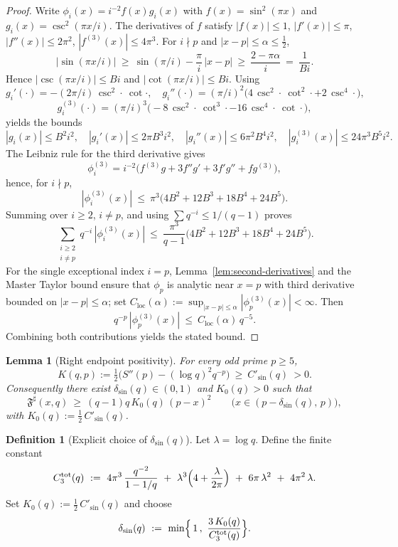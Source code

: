 \documentclass[11pt,a4paper]{amsart}
\newcommand{\Fbase}{\mathfrak F}
\newcommand{\Fsharp}{\Fbase^{\sharp}}
\theoremstyle{plain}
\newtheorem{lemma}[theorem]{Lemma}
\theoremstyle{definition}
\newtheorem{definition}[theorem]{Definition}
\theoremstyle{remark}
\begin{document}
\begin{proof}
Write $\phi_i(x)=i^{-2}f(x)g_i(x)$ with $f(x)=\sin^2(\pi x)$ and $g_i(x)=\csc^2(\pi x/i)$. The derivatives of $f$ satisfy $|f(x)|\le 1$, $|f'(x)|\le \pi$, $|f''(x)|\le 2\pi^2$, $|f^{(3)}(x)|\le 4\pi^3$. For $i\nmid p$ and $|x-p|\le\alpha\le\tfrac12$,
\[
|\sin(\pi x/i)|\ \ge\ \sin(\pi/i)-\frac{\pi}{i}\,|x-p|\ \ge\ \frac{2-\pi\alpha}{i}\ =\ \frac{1}{Bi}.
\]
Hence $|\csc(\pi x/i)|\le Bi$ and $|\cot(\pi x/i)|\le Bi$. Using
\[
g_i'(\cdot)=-(2\pi/i)\,\csc^2\!\cdot\ \cot\!\cdot,\quad
g_i''(\cdot)=(\pi/i)^2\big(4\,\csc^2\!\cdot\ \cot^2\!\cdot+2\,\csc^4\!\cdot\big),
\]
\[
g_i^{(3)}(\cdot)=(\pi/i)^3\big(-8\,\csc^2\!\cdot\ \cot^3\!\cdot-16\,\csc^4\!\cdot\ \cot\!\cdot\big),
\]
yields the bounds
\[
|g_i(x)|\le B^2 i^2,\quad |g_i'(x)|\le 2\pi B^3 i^2,\quad |g_i''(x)|\le 6\pi^2 B^4 i^2,\quad |g_i^{(3)}(x)|\le 24\pi^3 B^5 i^2.
\]
The Leibniz rule for the third derivative gives
\[
\phi_i^{(3)}=i^{-2}\big(f^{(3)}g+3f''g'+3f'g''+fg^{(3)}\big),
\]
hence, for $i\nmid p$,
\[
|\phi_i^{(3)}(x)|\ \le\ \pi^3\Big(4B^2+12B^3+18B^4+24B^5\Big).
\]
Summing over $i\ge2$, $i\ne p$, and using $\sum q^{-i}\le 1/(q-1)$ proves
\[
\sum_{\substack{i\ge2\\i\ne p}} q^{-i}\,|\phi_i^{(3)}(x)|\ \le\ \frac{\pi^3}{q-1}\Big(4B^2+12B^3+18B^4+24B^5\Big).
\]
For the single exceptional index $i=p$, Lemma~\ref{lem:second-derivatives} and the Master Taylor bound ensure that $\phi_p$ is analytic near $x=p$ with third derivative bounded on $|x-p|\le\alpha$; set $C_{\mathrm{loc}}(\alpha):=\sup_{|x-p|\le\alpha}|\phi_p^{(3)}(x)|<\infty$. Then
\[
q^{-p}\,|\phi_p^{(3)}(x)|\ \le\ C_{\mathrm{loc}}(\alpha)\,q^{-5}.
\]
Combining both contributions yields the stated bound.
\end{proof}

\begin{lemma}[Right endpoint positivity]\label{lem:right-positive}
For every odd prime $p\ge5$,
\[
K(q,p):=\tfrac12\Big(S''(p)-(\log q)^2 q^{-p}\Big)\ \ge\ C'_{\sin}(q)\ >0.
\]
Consequently there exist $\delta_{\sin}(q)\in(0,1)$ and $K_0(q)>0$ such that
\[
\Fsharp(x,q)\ \ge\ (q-1)q\,K_0(q)\,(p-x)^2\qquad\bigl(x\in(p-\delta_{\sin}(q),\,p)\bigr),
\]
with $K_0(q):=\tfrac12\,C'_{\sin}(q)$.
\end{lemma}

\begin{definition}[Explicit choice of $\delta_{\sin}(q)$]\label{def:delta-sin-explicit}
Let $\lambda=\log q$. Define the finite constant
\[
C_3^{\mathrm{tot}}(q)\ :=\ 4\pi^3\,\frac{q^{-2}}{1-1/q}\ +\ \lambda^3\Bigl(4+\frac{\lambda}{2\pi}\Bigr)\ +\ 6\pi\,\lambda^2\ +\ 4\pi^2\,\lambda.
\]
Set $K_0(q):=\tfrac12\,C'_{\sin}(q)$ and choose
\[
\delta_{\sin}(q)\ :=\ \min\Bigl\{\,1\,,\ \frac{3\,K_0(q)}{C_3^{\mathrm{tot}}(q)}\Bigr\}.
\]
\end{definition}
\end{document}
